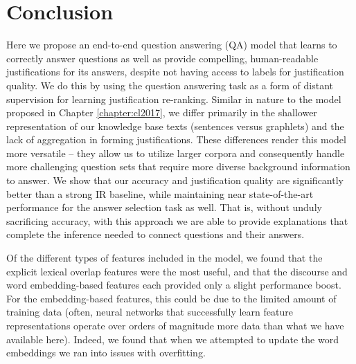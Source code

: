 \section{Conclusion}
\label{sec-emnlp2017:conclusions}

Here we propose an end-to-end question answering (QA) model that learns to correctly answer questions as well as provide compelling, human-readable justifications for its answers,  despite not having access to labels for justification quality.  We do this by using the question answering task as a form of distant supervision for learning  justification re-ranking.  Similar in nature to the model proposed in Chapter \ref{chapter:cl2017}, we differ primarily in the shallower representation of our knowledge base texts (sentences versus graphlets) and the lack of aggregation in forming justifications.  These differences render this model more versatile -- they allow us to utilize larger corpora and consequently handle more challenging question sets that require more diverse background information to answer.   We show that our accuracy and justification quality are significantly better than a strong IR baseline, while maintaining near state-of-the-art performance for the answer selection task as well.  That is, without unduly sacrificing accuracy, with this approach we are able to provide explanations that complete the inference needed to connect questions and their answers.

Of the different types of features included in the model, we found that the explicit lexical overlap features were the most useful, and that the discourse and word embedding-based features each provided only a slight performance boost.  For the embedding-based features, this could be due to the limited amount of training data (often, neural networks that successfully learn feature representations operate over orders of magnitude more data than what we have available here).  Indeed, we found that when we attempted to update the word embeddings we ran into issues with  overfitting.  

